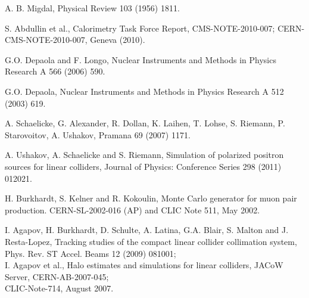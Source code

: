  A. B. Migdal,
                       Physical Review 103 (1956) 1811.

 S. Abdullin et al., Calorimetry Task Force Report, 
                      CMS-NOTE-2010-007; CERN-CMS-NOTE-2010-007, Geneva (2010).

 G.O. Depaola and F. Longo,
                       Nuclear Instruments and Methods in Physics Research A 566 (2006) 590.

 G.O. Depaola,
                        Nuclear Instruments and Methods in Physics Research A 512 (2003) 619.

 A. Schaelicke, G. Alexander, R. Dollan, K. Laihen, T. Lohse, S. Riemann,
                     P. Starovoitov, A. Ushakov,
                     Pramana 69 (2007) 1171.

 A. Ushakov, A. Schaelicke and S. Riemann, Simulation of polarized 
                     positron sources for linear colliders,
                     Journal of Physics: Conference Series 298 (2011) 012021.


 H. Burkhardt, S. Kelner and R. Kokoulin, Monte Carlo generator for
                      muon pair production. CERN-SL-2002-016 (AP) and CLIC Note 511,
                      May 2002.

 I. Agapov, H. Burkhardt, D. Schulte, A. Latina, G.A. Blair,
                     S. Malton and J. Resta-Lopez, Tracking studies of the compact linear
                     collider collimation system, Phys. Rev. ST Accel. Beams 12 (2009) 081001; \\
                     I. Agapov et al., Halo estimates and simulations for linear colliders,  
                     JACoW Server, CERN-AB-2007-045; \\
                     CLIC-Note-714, August 2007.

